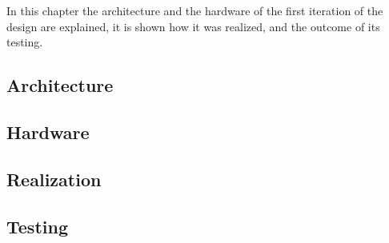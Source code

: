 
\IEEEPARstart
{I}{n} this chapter the architecture and the hardware of 
the first iteration of the design are explained, it is shown
how it was realized, and the outcome of its testing. 

\subsection{Architecture}

\subsection{Hardware}

\subsection{Realization}

\subsection{Testing}
